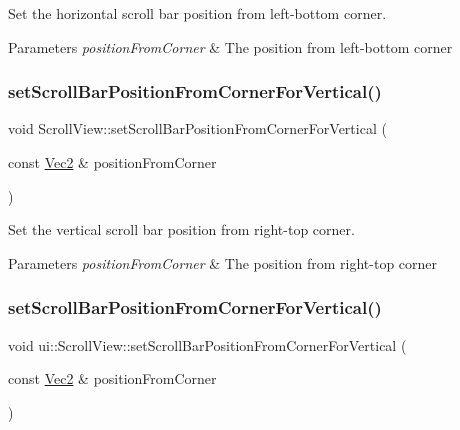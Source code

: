 Set the horizontal scroll bar position from left-\/bottom corner. 


\begin{DoxyParams}{Parameters}
{\em position\+From\+Corner} & The position from left-\/bottom corner \\
\hline
\end{DoxyParams}
\mbox{\label{classui_1_1ScrollView_a651e4c42ddd0fad838342eabddd10ba9}} 
\subsubsection{\texorpdfstring{set\+Scroll\+Bar\+Position\+From\+Corner\+For\+Vertical()}{setScrollBarPositionFromCornerForVertical()}\hspace{0.1cm}{\footnotesize\ttfamily [1/2]}}
{\footnotesize\ttfamily void Scroll\+View\+::set\+Scroll\+Bar\+Position\+From\+Corner\+For\+Vertical (\begin{DoxyParamCaption}\item[{const \hyperlink{classVec2}{Vec2} \&}]{position\+From\+Corner }\end{DoxyParamCaption})}



Set the vertical scroll bar position from right-\/top corner. 


\begin{DoxyParams}{Parameters}
{\em position\+From\+Corner} & The position from right-\/top corner \\
\hline
\end{DoxyParams}
\mbox{\label{classui_1_1ScrollView_ab7cf5ce2326062e96fa6dfaa947399fe}} 
\subsubsection{\texorpdfstring{set\+Scroll\+Bar\+Position\+From\+Corner\+For\+Vertical()}{setScrollBarPositionFromCornerForVertical()}\hspace{0.1cm}{\footnotesize\ttfamily [2/2]}}
{\footnotesize\ttfamily void ui\+::\+Scroll\+View\+::set\+Scroll\+Bar\+Position\+From\+Corner\+For\+Vertical (\begin{DoxyParamCaption}\item[{const \hyperlink{classVec2}{Vec2} \&}]{position\+From\+Corner }\end{DoxyParamCaption})}



